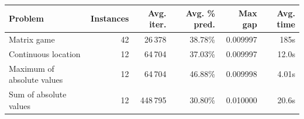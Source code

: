 \begin{tabular}{lrrrrr}
\toprule
Problem & Instances & Avg. iter. & Avg. \% pred. & Max gap & Avg. time \\
\midrule
Matrix game & 42 & 26\,378 & 38.78\% & 0.009997 & 185s \\
Continuous location & 12 & 64\,704 & 37.03\% & 0.009997 & 12.0s \\
Maximum of absolute values & 12 & 64\,704 & 46.88\% & 0.009998 & 4.01s \\
Sum of absolute values & 12 & 448\,795 & 30.80\% & 0.010000 & 20.6s \\
\bottomrule
\end{tabular}